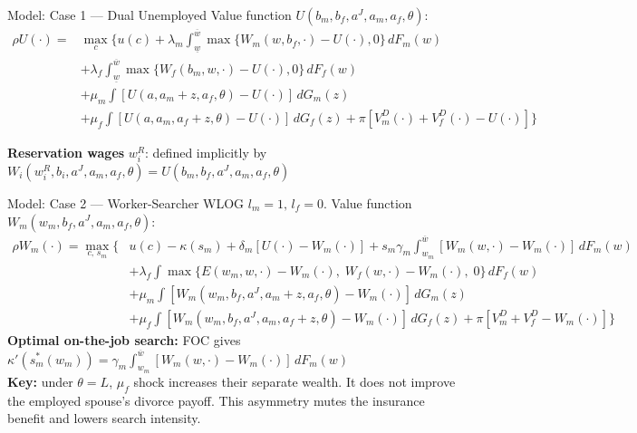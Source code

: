 \documentclass[aspectratio=169, 11pt]{beamer}
\newcommand{\B}[1]{\textcolor{dutch}{\textbf{#1}}}
\begin{document}
\begin{frame}{Model: Case 1 — Dual Unemployed}
\small
Value function $U(b_m, b_f, a^J, a_m, a_f, \theta)$:
\begin{align*}
  \rho U(\cdot) = & \max_c \Bigg\{ u(c) + \lambda_m \int_{\underline{w}}^{\overline{w}} \max\{W_m(w,b_f,\cdot) - U(\cdot), 0\}\,dF_m(w) \\
    & + \lambda_f \int_{\underline{w}}^{\overline{w}} \max\{W_f(b_m,w,\cdot) - U(\cdot), 0\}\,dF_f(w) \\
    & + \mu_m \int [U(a, a_m{+}z, a_f, \theta) - U(\cdot)]\,dG_m(z) \\
    & + \mu_f \int [U(a, a_m, a_f{+}z, \theta) - U(\cdot)]\,dG_f(z) + \pi [V^D_m(\cdot) + V^D_f(\cdot) - U(\cdot)] \Bigg\}
\end{align*}

\vspace{0.2em}
\textbf{Reservation wages} $w^R_i$: defined implicitly by
$W_i(w^R_i, b_i, a^J, a_m, a_f, \theta) = U(b_m,b_f,a^J, a_m, a_f, \theta)$

\vspace{0.4em}
\end{frame}

\begin{frame}{Model: Case 2 — Worker-Searcher}
\small
WLOG $l_m = 1,\, l_f = 0$. Value function $W_m(w_m,b_f, a^J, a_m, a_f, \theta)$:
\begin{align*}
\rho W_m(\cdot) = \max_{c,\, s_m} \Bigg\{&
u(c) - \kappa(s_m)
+ \delta_m [U(\cdot) - W_m(\cdot)]
+ s_m \gamma_m \int_{w_m}^{\overline{w}} [W_m(w,\cdot) - W_m(\cdot)]\,dF_m(w) \\
&+ \lambda_f \int \max\{E(w_m, w, \cdot) - W_m(\cdot),\; W_f(w,\cdot) - W_m(\cdot),\; 0\}\,dF_f(w) \\
&+ \mu_m \int [W_m(w_m, b_f, a^J, a_m{+}z, a_f, \theta) - W_m(\cdot)]\,dG_m(z) \\
&+ \mu_f \int [W_m(w_m, b_f, a^J, a_m, a_f{+}z, \theta) - W_m(\cdot)]\,dG_f(z)
+ \pi [V^D_m + V^D_f - W_m(\cdot)]
\Bigg\}
\end{align*}
\vspace{0.2em}
\textbf{Optimal on-the-job search:} FOC gives
$\kappa'(s_m^*(w_m)) = \gamma_m \int_{w_m}^{\overline{w}} [W_m(w,\cdot) - W_m(\cdot)]\,dF_m(w)$ \\
\vspace{0.3em}
\B{Key:} under $\theta = L$, $\mu_f$ shock increases their separate wealth. It does not improve the employed spouse's divorce payoff. This asymmetry mutes the insurance benefit and lowers search intensity.
\end{frame}
\end{document}
